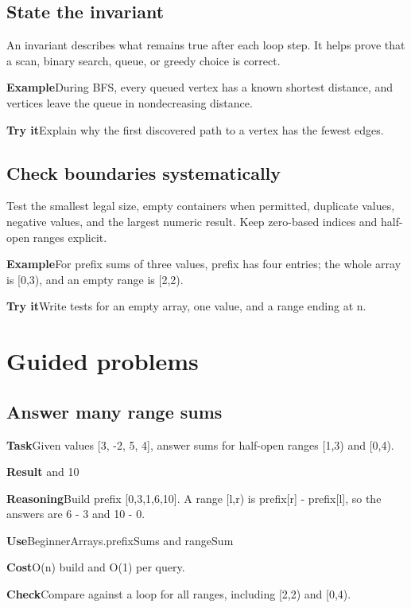 \documentclass[10pt,letterpaper]{article}
\newcommand{\entrylabel}[1]{\textcolor{accent}{\bfseries #1}}
\begin{document}
\subsection*{State the invariant}
An invariant describes what remains true after each loop step. It helps prove that a scan, binary search, queue, or greedy choice is correct.\par
\begin{guidebox}\entrylabel{Example}\quad During BFS, every queued vertex has a known shortest distance, and vertices leave the queue in nondecreasing distance.\par
\entrylabel{Try it}\quad Explain why the first discovered path to a vertex has the fewest edges.\end{guidebox}
\subsection*{Check boundaries systematically}
Test the smallest legal size, empty containers when permitted, duplicate values, negative values, and the largest numeric result. Keep zero-based indices and half-open ranges explicit.\par
\begin{guidebox}\entrylabel{Example}\quad For prefix sums of three values, prefix has four entries; the whole array is [0,3), and an empty range is [2,2).\par
\entrylabel{Try it}\quad Write tests for an empty array, one value, and a range ending at n.\end{guidebox}
\clearpage\section*{Guided problems}
\subsection*{Answer many range sums}
\noindent\entrylabel{Task}\quad Given values [3, -2, 5, 4], answer sums for half-open ranges [1,3) and [0,4).\par
\noindent\entrylabel{Result} and 10\par
\noindent\entrylabel{Reasoning}\quad Build prefix [0,3,1,6,10]. A range [l,r) is prefix[r] - prefix[l], so the answers are 6 - 3 and 10 - 0.\par
\noindent\entrylabel{Use}\quad BeginnerArrays.prefixSums and rangeSum\par
\noindent\entrylabel{Cost}\quad O(n) build and O(1) per query.\par
\noindent\entrylabel{Check}\quad Compare against a loop for all ranges, including [2,2) and [0,4).\par
\end{document}
